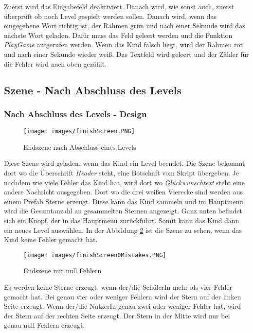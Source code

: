 Zuerst wird das Eingabefeld deaktiviert. Danach wird, wie sonst auch, zuerst überprüft ob noch Level gespielt werden sollen. Danach wird, wenn das eingegebene Wort richtig ist, der Rahmen grün und nach einer Sekunde wird das nächste Wort geladen. Dafür muss das Feld geleert werden und die Funktion \textit{PlayGame} aufgerufen werden. Wenn das Kind falsch liegt, wird der Rahmen rot und nach einer Sekunde wieder weiß. Das Textfeld wird geleert und der Zähler für die Fehler wird nach oben gezählt.
\subsection{Szene - Nach Abschluss des Levels}
\subsubsection{Nach Abschluss des Levels - Design}
\begin{figure}[htbp]
  \centering
  \texttt{[image: images/finishScreen.PNG]}
  \caption{Endszene nach Abschluss eines Levels}
  \label{finishSzene}
\end{figure}
Diese Szene wird geladen, wenn das Kind ein Level beendet. Die Szene bekommt dort wo die Überschrift \textit{Header} steht, eine Botschaft vom Skript übergeben. Je nachdem wie viele Fehler das Kind hat, wird dort wo \textit{Glückwunschtext} steht eine andere Nachricht ausgegeben. Dort wo die drei weißen Vierecke sind werden aus einem Prefab Sterne erzeugt. Diese kann das Kind sammeln und im Hauptmenü wird die Gesamtanzahl an gesammelten Sternen angezeigt. Ganz unten befindet sich ein Knopf, der in das Hauptmenü zurückführt. Somit kann das Kind dann ein neues Level auswählen. In der Abbildung \ref{withoutError} ist die Szene zu sehen, wenn das Kind keine Fehler gemacht hat.
\begin{figure}[htbp]
  \centering
  \texttt{[image: images/finishScreen0Mistakes.PNG]}
  \caption{Endszene mit null Fehlern}
  \label{withoutError}
\end{figure}
Es werden keine Sterne erzeugt, wenn der/die SchülerIn mehr als vier Fehler gemacht hat. Bei genau vier oder weniger Fehlern wird der Stern auf der linken Seite erzeugt. Wenn der/die NutzerIn genau zwei oder weniger Fehler hat, wird der Stern auf der rechten Seite erzeugt. Der Stern in der Mitte wird nur bei genau null Fehlern erzeugt.
